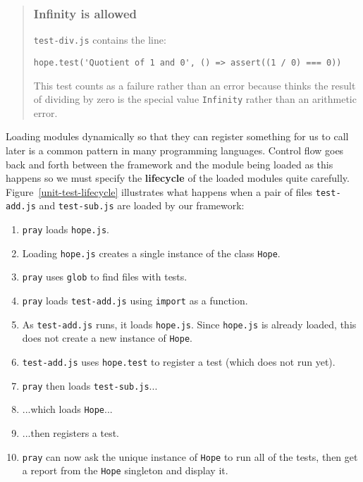 \documentclass[krantzl]{krantz}
\newcommand{\figref}[1]{Figure~\ref{#1}}
\newcommand{\glossref}[1]{\textbf{#1}}
\newenvironment{callout}{\savenotes\begin{tBox}\begin{quotation}\toggletrue{inbox}\renewcommand{\thempfootnote}{\arabic{footnote}}}{\end{quotation}\vspace{\baselineskip}\end{tBox}\togglefalse{inbox}\spewnotes}
\begin{document}
\begin{callout}


\subsubsection*{Infinity is allowed}


\texttt{test-div.js} contains the line:

\begin{lstlisting}[frame=tblr]
hope.test('Quotient of 1 and 0', () => assert((1 / 0) === 0))
\end{lstlisting}


This test counts as a failure rather than an error
because thinks the result of dividing by zero is the special value \texttt{Infinity}
rather than an arithmetic error.

\end{callout}


Loading modules dynamically so that they can register something for us to call later
is a common pattern in many programming languages.
Control flow goes back and forth between the framework and the module being loaded
as this happens
so we must specify the \glossref{lifecycle} of the loaded modules quite carefully.
\figref{unit-test-lifecycle} illustrates what happens
when a pair of files \texttt{test-add.js} and \texttt{test-sub.js} are loaded by our framework:

\begin{enumerate}

\item \texttt{pray} loads \texttt{hope.js}.

\item Loading \texttt{hope.js} creates a single instance of the class \texttt{Hope}.

\item \texttt{pray} uses \texttt{glob} to find files with tests.

\item \texttt{pray} loads \texttt{test-add.js} using \texttt{import} as a function.

\item As \texttt{test-add.js} runs, it loads \texttt{hope.js}.
    Since \texttt{hope.js} is already loaded, this does not create a new instance of \texttt{Hope}.

\item \texttt{test-add.js} uses \texttt{hope.test} to register a test (which does not run yet).

\item \texttt{pray} then loads \texttt{test-sub.js}...

\item ...which loads \texttt{Hope}...

\item ...then registers a test.

\item \texttt{pray} can now ask the unique instance of \texttt{Hope} to run all of the tests,
     then get a report from the \texttt{Hope} singleton and display it.

\end{enumerate}
\end{document}
